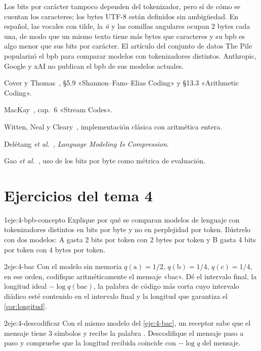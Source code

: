 Los bits por carácter tampoco dependen del tokenizador, pero sí de cómo se cuentan los caracteres; los bytes UTF-8 están definidos sin ambigüedad. En español, las vocales con tilde, la \emph{ñ} y las comillas angulares ocupan 2 bytes cada una, de modo que un mismo texto tiene más bytes que caracteres y su bpb es algo menor que sus bits por carácter. El artículo del conjunto de datos The Pile~\cite{pile} popularizó el bpb para comparar modelos con tokenizadores distintos. Anthropic, Google y xAI no publican el bpb de sus modelos actuales.

\begin{lecturas}
\item Cover y Thomas~\cite{ct}, §5.9 «Shannon--Fano--Elias Coding» y §13.3 «Arithmetic Coding».
\item MacKay~\cite{mackay}, cap.~6 «Stream Codes».
\item Witten, Neal y Cleary~\cite{wnc}, implementación clásica con aritmética entera.
\item Delétang \emph{et al.}~\cite{deletang}, \emph{Language Modeling Is Compression}.
\item Gao \emph{et al.}~\cite{pile}, uso de los bits por byte como métrica de evaluación.
\end{lecturas}

\section*{Ejercicios del tema 4}

\begin{ejercicio}{1}{eje:4-bpb-concepto}
Explique por qué se comparan modelos de lenguaje con tokenizadores distintos en bits por byte y no en perplejidad por token. Ilústrelo con dos modelos: A gasta 2 bits por token con 2 bytes por token y B gasta 4 bits por token con 4 bytes por token.
\end{ejercicio}

\begin{ejercicio}{2}{eje:4-bac}
Con el modelo sin memoria $q(\mathrm{a})=1/2$, $q(\mathrm{b})=1/4$, $q(\mathrm{c})=1/4$, en ese orden, codifique aritméticamente el mensaje «bac». Dé el intervalo final, la longitud ideal $-\log q(\text{bac})$, la palabra de código más corta cuyo intervalo diádico esté contenido en el intervalo final y la longitud que garantiza el \cref{cor:longitud}.
\end{ejercicio}

\begin{ejercicio}{2}{eje:4-descodificar}
Con el mismo modelo del \cref{eje:4-bac}, un receptor sabe que el mensaje tiene 3 símbolos y recibe la palabra . Descodifique el mensaje paso a paso y compruebe que la longitud recibida coincide con $-\log q$ del mensaje.
\end{ejercicio}

